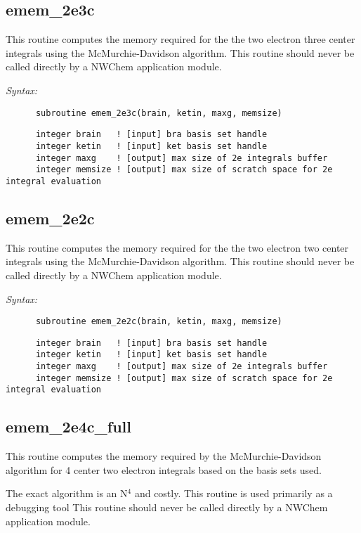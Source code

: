 \subsection{emem\_2e3c} 
This routine computes the memory required for the the two electron 
three center integrals using the McMurchie-Davidson algorithm.  
This routine should never be called directly by a  
NWChem application module. 
 
{\it Syntax:} 
\begin{verbatim} 
      subroutine emem_2e3c(brain, ketin, maxg, memsize) 
\end{verbatim} 
\begin{verbatim} 
      integer brain   ! [input] bra basis set handle 
      integer ketin   ! [input] ket basis set handle 
      integer maxg    ! [output] max size of 2e integrals buffer 
      integer memsize ! [output] max size of scratch space for 2e integral evaluation 
\end{verbatim} 
\subsection{emem\_2e2c} 
This routine computes the memory required for the the two electron 
two center integrals using the McMurchie-Davidson algorithm.  
This routine should never be called directly by a  
NWChem application module. 
 
{\it Syntax:} 
\begin{verbatim} 
      subroutine emem_2e2c(brain, ketin, maxg, memsize) 
\end{verbatim} 
\begin{verbatim} 
      integer brain   ! [input] bra basis set handle 
      integer ketin   ! [input] ket basis set handle 
      integer maxg    ! [output] max size of 2e integrals buffer 
      integer memsize ! [output] max size of scratch space for 2e integral evaluation 
\end{verbatim} 
\subsection{emem\_2e4c\_full} 
This routine computes the memory required by the McMurchie-Davidson  
algorithm for 4 center two electron integrals based on the  
basis sets used.   
 
The exact algorithm is an N$^4$ and costly.  This routine is used 
primarily as a debugging tool 
This routine should never be called directly by a  
NWChem application module. 
 
